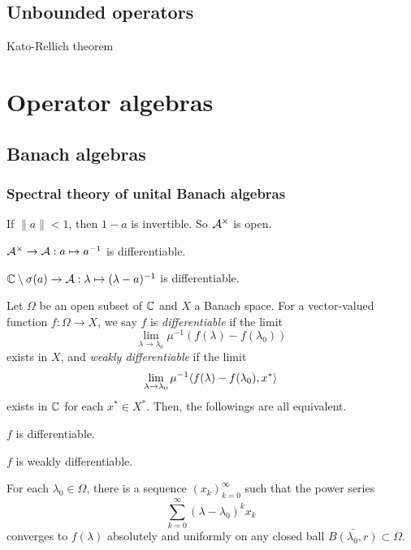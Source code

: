 \documentclass{../note}
\begin{document}
\chapter{Unbounded operators}



Kato-Rellich theorem











\part{Operator algebras}
\chapter{Banach algebras}

\section{Spectral theory of unital Banach algebras}

\begin{prb}
\begin{parts}
\item If $\|a\|<1$, then $1-a$ is invertible. So $\mathcal{A}^\times$ is open.
\item $\mathcal{A}^\times\to\mathcal{A}:a\mapsto a^{-1}$ is differentiable.
\item $\mathbb{C}\setminus\sigma(a)\to\mathcal{A}:\lambda\mapsto(\lambda-a)^{-1}$ is differentiable.
\end{parts}
\end{prb}

\begin{prb}
Let $\Omega$ be an open subset of $\mathbb{C}$ and $X$ a Banach space.
For a vector-valued function $f:\Omega\to X$, we say $f$ is \emph{differentiable} if the limit
\[\lim_{\lambda\to\lambda_0}\mu^{-1}(f(\lambda)-f(\lambda_0))\]
exists in $X$, and \emph{weakly differentiable} if the limit
\[\lim_{\lambda\to\lambda_0}\mu^{-1}\langle f(\lambda)-f(\lambda_0),x^*\rangle\]
exists in $\mathbb{C}$ for each $x^*\in X^*$.
Then, the followings are all equivalent.
\begin{parts}
\item $f$ is differentiable.
\item $f$ is weakly differentiable.
\item For each $\lambda_0\in\Omega$, there is a sequence $(x_k)_{k=0}^\infty$ such that the power series
\[\sum_{k=0}^\infty(\lambda-\lambda_0)^kx_k\]
converges to $f(\lambda)$ absolutely and uniformly on any closed ball $\bar{B(\lambda_0,r)}\subset\Omega$.
\end{parts}
\end{prb}
\end{document}
